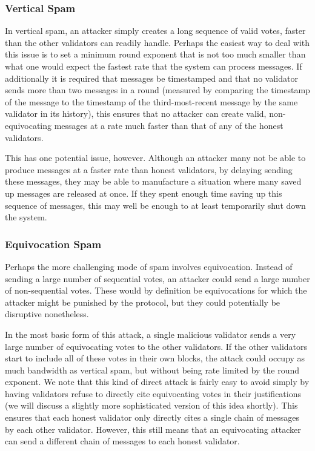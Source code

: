 \documentclass[12pt, fleqn]{article}
\begin{document}
\subsubsection{Vertical Spam}

In vertical spam, an attacker simply creates a long sequence of valid votes, faster than the other validators can readily handle. Perhaps the easiest way to deal with this issue is to set a minimum round exponent that is not too much smaller than what one would expect the fastest rate that the system can process messages. If additionally it is required that messages be timestamped and that no validator sends more than two messages in a round (measured by comparing the timestamp of the message to the timestamp of the third-most-recent message by the same validator in its history), this ensures that no attacker can create valid, non-equivocating messages at a rate much faster than that of any of the honest validators.

This has one potential issue, however. Although an attacker many not be able to produce messages at a faster rate than honest validators, by delaying sending these messages, they may be able to manufacture a situation where many saved up messages are released at once. If they spent enough time saving up this sequence of messages, this may well be enough to at least temporarily shut down the system.

\subsubsection{Equivocation Spam}

Perhaps the more challenging mode of spam involves equivocation. Instead of sending a large number of sequential votes, an attacker could send a large number of non-sequential votes. These would by definition be equivocations for which the attacker might be punished by the protocol, but they could potentially be disruptive nonetheless.

In the most basic form of this attack, a single malicious validator sends a very large number of equivocating votes to the other validators. If the other validators start to include all of these votes in their own blocks, the attack could occupy as much bandwidth as vertical spam, but without being rate limited by the round exponent. We note that this kind of direct attack is fairly easy to avoid simply by having validators refuse to directly cite equivocating votes in their justifications (we will discuss a slightly more sophisticated version of this idea shortly). This ensures that each honest validator only directly cites a single chain of messages by each other validator. However, this still means that an equivocating attacker can send a different chain of messages to each honest validator.
\end{document}
